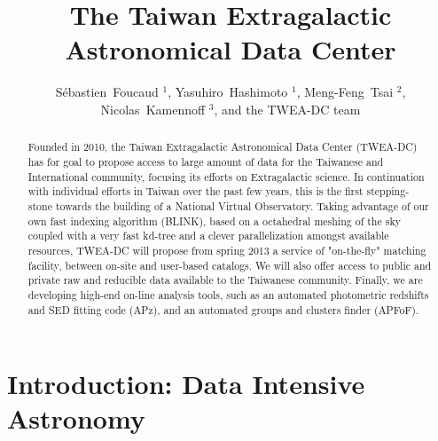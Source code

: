 \documentclass[11pt,twoside]{article}
\begin{document}
\title{The Taiwan Extragalactic Astronomical Data Center}
\author{S\'ebastien~Foucaud $^1$, Yasuhiro~Hashimoto $^1$, Meng-Feng~Tsai $^2$, Nicolas~Kamennoff $^3$, and the TWEA-DC team
}
\begin{abstract}
Founded in 2010, the Taiwan Extragalactic Astronomical Data Center (TWEA-DC) has for goal to propose access to large amount of data for the Taiwanese and International community, focusing its efforts on Extragalactic science. In continuation with individual efforts in Taiwan over the past few years, this is the first stepping-stone towards the building of a National Virtual Observatory.  Taking advantage of our own fast indexing algorithm (BLINK), based on a octahedral meshing of the sky coupled with a very fast kd-tree and a clever parallelization amongst available resources, TWEA-DC will propose from spring 2013 a service of "on-the-fly" matching facility, between on-site and user-based catalogs.  We will also offer access to public and private raw and reducible data available to the Taiwanese community.  
Finally, we are developing high-end on-line analysis tools, such as an automated photometric redshifts and SED fitting code (APz), and an automated groups and clusters finder (APFoF).
\end{abstract}


\section{Introduction: Data Intensive Astronomy}
\end{document}
